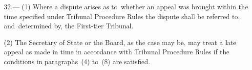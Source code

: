 \documentclass[12pt,a4paper]{article}
\begin{document}
32.—%
%
%
%
(1) Where a dispute arises as to~whether an appeal was brought within the time specified under Tribunal Procedure Rules the dispute shall be referred to, and~determined by, the First-tier Tribunal.

(2) The Secretary of State
or the Board, as the case may be, may treat a late appeal as made in time in accordance with Tribunal Procedure Rules if the conditions in paragraphs~(4) to~(8) are satisfied.

%

%
\end{document}
